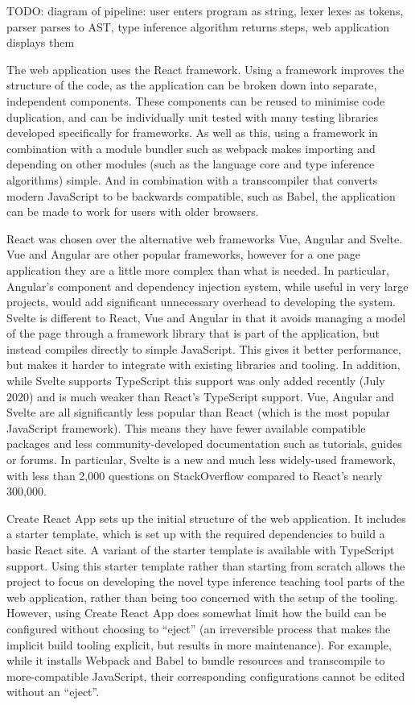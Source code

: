 \documentclass[a4paper,fleqn,oneside,12pt]{report}
\begin{document}
TODO: diagram of pipeline: user enters program as string, lexer lexes as tokens, parser parses to AST, type inference algorithm returns steps, web application displays them

The web application uses the React framework. Using a framework improves the structure of the code, as the application can be broken down into separate, independent components. These components can be reused to minimise code duplication, and can be individually unit tested with many testing libraries developed specifically for frameworks. As well as this, using a framework in combination with a module bundler such as webpack makes importing and depending on other modules (such as the language core and type inference algorithms) simple. And in combination with a transcompiler that converts modern JavaScript to be backwards compatible, such as Babel, the application can be made to work for users with older browsers.

React was chosen over the alternative web frameworks Vue, Angular and Svelte. Vue and Angular are other popular frameworks, however for a one page application they are a little more complex than what is needed. In particular, Angular’s component and dependency injection system, while useful in very large projects, would add significant unnecessary overhead to developing the system. Svelte is different to React, Vue and Angular in that it avoids managing a model of the page through a framework library that is part of the application, but instead compiles directly to simple JavaScript. This gives it better performance, but makes it harder to integrate with existing libraries and tooling. In addition, while Svelte supports TypeScript this support was only added recently (July 2020) and is much weaker than React’s TypeScript support. Vue, Angular and Svelte are all significantly less popular than React (which is the most popular JavaScript framework). This means they have fewer available compatible packages and less community-developed documentation such as tutorials, guides or forums. In particular, Svelte is a new and much less widely-used framework, with less than 2,000 questions on StackOverflow compared to React’s nearly 300,000.

Create React App sets up the initial structure of the web application. It includes a starter template, which is set up with the required dependencies to build a basic React site. A variant of the starter template is available with TypeScript support. Using this starter template rather than starting from scratch allows the project to focus on developing the novel type inference teaching tool parts of the web application, rather than being too concerned with the setup of the tooling. However, using Create React App does somewhat limit how the build can be configured without choosing to “eject” (an irreversible process that makes the implicit build tooling explicit, but results in more maintenance). For example, while it installs Webpack and Babel to bundle resources and transcompile to more-compatible JavaScript, their corresponding configurations cannot be edited without an “eject”.
\end{document}
